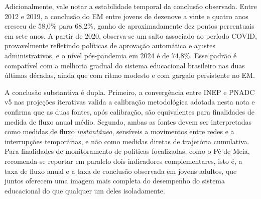Adicionalmente, vale notar a estabilidade temporal da
conclusão observada. Entre 2012 e 2019, a conclusão do EM
entre jovens de dezenove a vinte e quatro anos cresceu de
58,0\% para 68,2\%, ganho de aproximadamente dez pontos
percentuais em sete anos. A partir de 2020, observa-se um
salto associado ao período COVID, provavelmente refletindo
políticas de aprovação automática e ajustes administrativos, e
o nível pós-pandemia em 2024 é de 74,8\%. Esse padrão é
compatível com a melhoria gradual do sistema educacional
brasileiro nas duas últimas décadas, ainda que com ritmo
modesto e com gargalo persistente no EM.

A conclusão substantiva é dupla. Primeiro, a convergência
entre INEP e PNADC v5 nas projeções iterativas valida a
calibração metodológica adotada nesta nota e confirma que as
duas fontes, após calibração, são equivalentes para
finalidades de medida de fluxo anual médio. Segundo, ambas as
fontes devem ser interpretadas como medidas de fluxo
\emph{instantâneo}, sensíveis a movimentos entre redes e a
interrupções temporárias, e não como medidas diretas de
trajetória cumulativa. Para finalidades de monitoramento de
políticas focalizadas, como o Pé-de-Meia, recomenda-se
reportar em paralelo dois indicadores complementares, isto é,
a taxa de fluxo anual e a taxa de conclusão observada em
jovens adultos, que juntos oferecem uma imagem mais completa
do desempenho do sistema educacional do que qualquer um deles
isoladamente.
